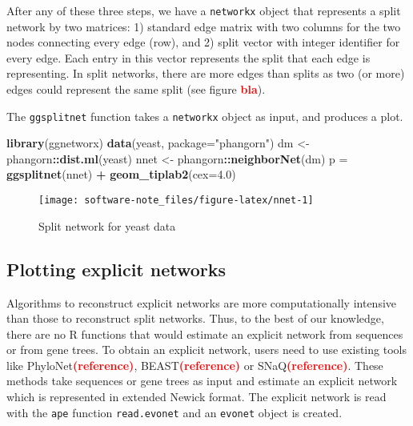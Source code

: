 \documentclass[]{IEEEtran}
\newenvironment{Shaded}{\begin{snugshade}}{\end{snugshade}}
\newcommand{\DataTypeTok}[1]{\textcolor[rgb]{0.13,0.29,0.53}{#1}}
\newcommand{\FloatTok}[1]{\textcolor[rgb]{0.00,0.00,0.81}{#1}}
\newcommand{\KeywordTok}[1]{\textcolor[rgb]{0.13,0.29,0.53}{\textbf{#1}}}
\newcommand{\NormalTok}[1]{#1}
\newcommand{\OperatorTok}[1]{\textcolor[rgb]{0.81,0.36,0.00}{\textbf{#1}}}
\newcommand{\StringTok}[1]{\textcolor[rgb]{0.31,0.60,0.02}{#1}}
\begin{document}
After any of these three steps, we have a \texttt{networkx} object that represents a split network by two matrices: 1) standard edge matrix with two columns for the two nodes connecting every edge (row), and 2) split vector with integer identifier for every edge. Each entry in this vector represents the split that each edge is representing. In split networks, there are more edges than splits as two (or more) edges could represent the same split (see figure \textcolor{red}{\textbf{bla}}).

The \texttt{ggsplitnet} function takes a \texttt{networkx} object as input, and produces a plot.

\begin{Shaded}
\begin{Highlighting}[]
\KeywordTok{library}\NormalTok{(ggnetworx)}
\KeywordTok{data}\NormalTok{(yeast, }\DataTypeTok{package=}\StringTok{"phangorn"}\NormalTok{)}
\NormalTok{dm <-}\StringTok{ }\NormalTok{phangorn}\OperatorTok{::}\KeywordTok{dist.ml}\NormalTok{(yeast) }
\NormalTok{nnet <-}\StringTok{ }\NormalTok{phangorn}\OperatorTok{::}\KeywordTok{neighborNet}\NormalTok{(dm)}
\NormalTok{p =}\StringTok{ }\KeywordTok{ggsplitnet}\NormalTok{(nnet) }\OperatorTok{+}\StringTok{ }\KeywordTok{geom_tiplab2}\NormalTok{(}\DataTypeTok{cex=}\FloatTok{4.0}\NormalTok{)}
\end{Highlighting}
\end{Shaded}

\begin{figure}[H]

{\centering \texttt{[image: software-note\_files/figure-latex/nnet-1]} 

}

\caption{Split network for yeast data}\label{fig:nnet}
\end{figure}

\hypertarget{plotting-explicit-networks}{%
\subsection{Plotting explicit networks}\label{plotting-explicit-networks}}

Algorithms to reconstruct explicit networks are more computationally intensive than those to reconstruct split networks. Thus, to the best of our knowledge, there are no R functions that would estimate an explicit network from sequences or from gene trees. To obtain an explicit network, users need to use existing tools like PhyloNet\textcolor{red}{\textbf{(reference)}}, BEAST\textcolor{red}{\textbf{(reference)}} or SNaQ\textcolor{red}{\textbf{(reference)}}.
These methods take sequences or gene trees as input and estimate an explicit network which is represented in extended Newick format. The explicit network is read with the \texttt{ape} function \texttt{read.evonet} and an \texttt{evonet} object is created.
\end{document}
